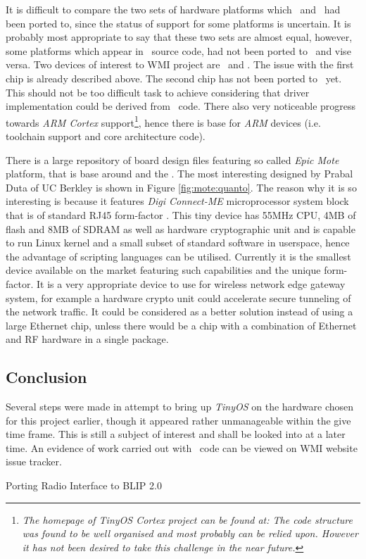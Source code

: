   It is difficult to compare the two sets of hardware platforms which
 \TinyOS\ and \Contiki\ had been ported to, since the status of support
 for some platforms is uncertain. It is probably most appropriate to
 say that these two sets are almost equal, however, some platforms
 which appear in \Contiki\ source code, had not been ported to \TinyOS\
 and vise versa. Two devices of interest to WMI project are \RFA\ and
 \MCX. The issue with the first chip is already described above.
 The second chip has not been ported to \TinyOS\ yet. This should not
 be too difficult task to achieve considering that driver implementation
 could be derived from \Contiki\ code. There also very noticeable
 progress towards \emph{ARM Cortex} support\footnote{\emph{The homepage
 of TinyOS Cortex project can be found at:
 The code structure was found to be well organised and most probably
 can be relied upon. However it has not been desired to take this
 challenge in the near future.}}, hence there is base for \emph{ARM}
 devices (i.e. toolchain support and core architecture code).
 

  There is a large repository of board design files featuring so called
 \emph{Epic Mote} platform, that is base around \Chip{CC2420} and the
 \Chip{MSP430} \cite{epic:homepage}. The most interesting designed by
 Prabal Duta of UC Berkley \cite{duta:homepage} is shown in Figure
 \ref{fig:mote:quanto}. The reason why it is so interesting is because
 it features \emph{Digi Connect-ME} microprocessor system block that is
 of standard RJ45 form-factor \cite{links:digi:cme}. This tiny device
 has 55MHz \Chip{ARM7TDMI} CPU, 4MB of flash and 8MB of SDRAM as well as
 hardware cryptographic unit and is capable to run Linux kernel and a
 small subset of standard software in userspace, hence the advantage of
 scripting languages can be utilised. Currently it is the smallest
 device available on the market featuring such capabilities and
 the unique form-factor. It is a very appropriate device to use for
 wireless network edge gateway system, for example a hardware crypto
 unit could accelerate secure tunneling of the network traffic. It
 could be considered as a better solution instead of using a large
 Ethernet chip, unless there would be a chip with a combination of
 Ethernet and RF hardware in a single package.



\subsection{Conclusion}

  Several steps were made in attempt to bring up \emph{TinyOS} on the
 hardware chosen for this project earlier, though it appeared rather
 unmanageable within the give time frame. This is still a subject of
 interest and shall be looked into at a later time. An evidence of
 work carried out with \TinyOS\ code can be viewed on WMI website
 issue tracker.

\TrackerList
  Porting Radio Interface to BLIP 2.0
\TrackerEnd

